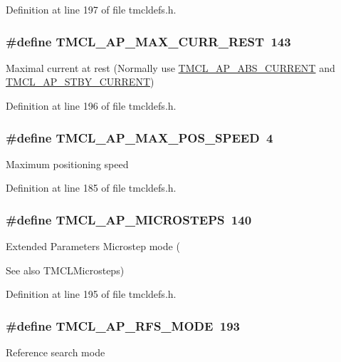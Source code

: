 Definition at line 197 of file tmcldefs.h.\hypertarget{group__RWParam_ga6c4829576ea5ead497c9fd6bc564ecf0}{
\subsubsection[{TMCL\_\-AP\_\-MAX\_\-CURR\_\-REST}]{\setlength{\rightskip}{0pt plus 5cm}\#define TMCL\_\-AP\_\-MAX\_\-CURR\_\-REST~143}}
\label{group__RWParam_ga6c4829576ea5ead497c9fd6bc564ecf0}
Maximal current at rest (Normally use \hyperlink{group__RWParam_gaaf8d5010f2cf9799b5321358b5f5fb35}{TMCL\_\-AP\_\-ABS\_\-CURRENT} and \hyperlink{group__RWParam_ga7e4a74f86decbbced917fb7825aef450}{TMCL\_\-AP\_\-STBY\_\-CURRENT}) 

Definition at line 196 of file tmcldefs.h.\hypertarget{group__RWParam_gafeecf0d7ec4c89beea4eb6e5dd3d5326}{
\subsubsection[{TMCL\_\-AP\_\-MAX\_\-POS\_\-SPEED}]{\setlength{\rightskip}{0pt plus 5cm}\#define TMCL\_\-AP\_\-MAX\_\-POS\_\-SPEED~4}}
\label{group__RWParam_gafeecf0d7ec4c89beea4eb6e5dd3d5326}
Maximum positioning speed 

Definition at line 185 of file tmcldefs.h.\hypertarget{group__RWParam_gaaf9500c37e13a506bcebb07378bb559c}{
\subsubsection[{TMCL\_\-AP\_\-MICROSTEPS}]{\setlength{\rightskip}{0pt plus 5cm}\#define TMCL\_\-AP\_\-MICROSTEPS~140}}
\label{group__RWParam_gaaf9500c37e13a506bcebb07378bb559c}
Extended Parameters Microstep mode (\begin{DoxySeeAlso}{See also}
TMCLMicrosteps) 
\end{DoxySeeAlso}


Definition at line 195 of file tmcldefs.h.\hypertarget{group__RWParam_gaf504e536f23e990387a1b4421fcc49e4}{
\subsubsection[{TMCL\_\-AP\_\-RFS\_\-MODE}]{\setlength{\rightskip}{0pt plus 5cm}\#define TMCL\_\-AP\_\-RFS\_\-MODE~193}}
\label{group__RWParam_gaf504e536f23e990387a1b4421fcc49e4}
Reference search mode 

